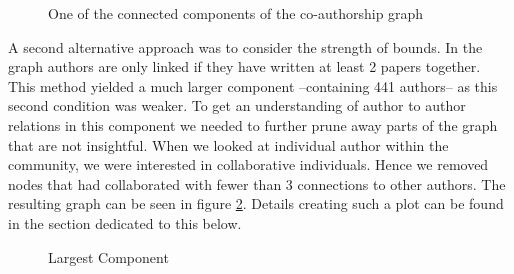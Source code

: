 \documentclass[article,twocolumn]{IEEEtran}
\begin{document}
    \begin{figure}
        \begin{center}\end{center}
        \caption{One of the connected components of the co-authorship graph}
        \label{fig_plot}
    \end{figure}
    
    A second alternative approach was to consider the strength of bounds. In
the graph authors are only linked if they have written at least 2 papers
together. This method yielded a much larger component --containing 441
authors-- as this second condition was weaker. To get an understanding
of author to author relations in this component we needed to further
prune away parts of the graph that are not insightful. When we looked at
individual author within the community, we were interested in
collaborative individuals. Hence we removed nodes that had collaborated
with fewer than 3 connections to other authors. The resulting graph can
be seen in figure \ref{author_collab_large}. Details creating such a
plot can be found in the section dedicated to this below.


    \begin{figure}
        \begin{center}\end{center}
        \caption{Largest Component}
        \label{author_collab_large}
    \end{figure}
    
\end{document}
